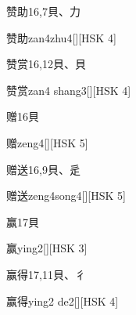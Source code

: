 \begin{entry}{赞助}{16,7}{⾙、⼒}
  \begin{phonetics}{赞助}{zan4zhu4}[][HSK 4]
  \end{phonetics}
\end{entry}

\begin{entry}{赞赏}{16,12}{⾙、⾙}
  \begin{phonetics}{赞赏}{zan4 shang3}[][HSK 4]
  \end{phonetics}
\end{entry}

\begin{entry}{赠}{16}{⾙}
  \begin{phonetics}{赠}{zeng4}[][HSK 5]
  \end{phonetics}
\end{entry}

\begin{entry}{赠送}{16,9}{⾙、⾡}
  \begin{phonetics}{赠送}{zeng4song4}[][HSK 5]
  \end{phonetics}
\end{entry}

\begin{entry}{赢}{17}{⾙}
  \begin{phonetics}{赢}{ying2}[][HSK 3]
  \end{phonetics}
\end{entry}

\begin{entry}{赢得}{17,11}{⾙、⼻}
  \begin{phonetics}{赢得}{ying2 de2}[][HSK 4]
  \end{phonetics}
\end{entry}


